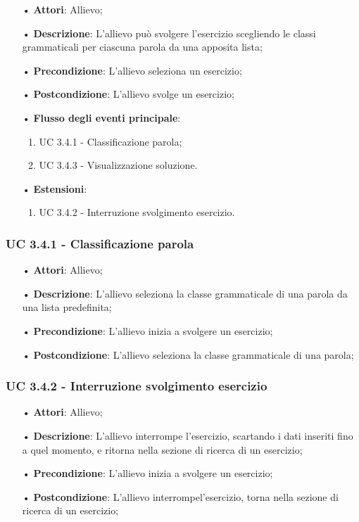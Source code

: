 \begin{itemize}
\item[•]\textbf{Attori}: Allievo;
\item[•]\textbf{Descrizione}: L'allievo può svolgere l'esercizio scegliendo le classi grammaticali per ciascuna parola da una apposita lista;
\item[•]\textbf{Precondizione}: L'allievo seleziona un esercizio;
\item[•]\textbf{Postcondizione}: L'allievo svolge un esercizio;
\item[•]\textbf{Flusso degli eventi principale}:
\begin{enumerate}
\item UC 3.4.1 - Classificazione parola;
\item UC 3.4.3 - Visualizzazione soluzione.  %
\end{enumerate}
\item[•]\textbf{Estensioni}:
\begin{enumerate}
\item UC 3.4.2 - Interruzione svolgimento esercizio.
\end{enumerate}
\end{itemize}

\subsubsection{UC 3.4.1 - Classificazione parola}
\begin{itemize}
\item[•]\textbf{Attori}: Allievo;
\item[•]\textbf{Descrizione}: L'allievo seleziona la classe grammaticale di una parola da una lista predefinita;
\item[•]\textbf{Precondizione}: L'allievo inizia a svolgere un esercizio;
\item[•]\textbf{Postcondizione}: L'allievo seleziona la classe grammaticale di una parola;
\end{itemize}

\subsubsection{UC 3.4.2 - Interruzione svolgimento esercizio}
\begin{itemize}
\item[•]\textbf{Attori}: Allievo;
\item[•]\textbf{Descrizione}: L'allievo interrompe l'esercizio, scartando i dati inseriti fino a quel momento, e ritorna nella sezione di ricerca di un esercizio;
\item[•]\textbf{Precondizione}: L'allievo inizia a svolgere un esercizio;
\item[•]\textbf{Postcondizione}: L'allievo interrompel'esercizio, torna nella sezione di ricerca di un esercizio;
\end{itemize}

